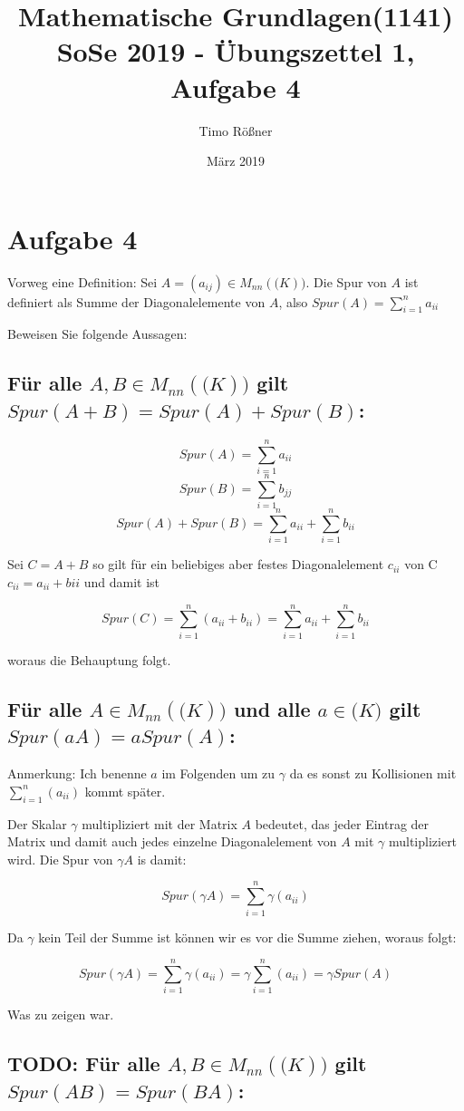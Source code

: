 \documentclass{article}
\title{Mathematische Grundlagen(1141) SoSe 2019 - Übungszettel 1, Aufgabe 4}
\author{Timo Rößner }
\date{März 2019}
\begin{document}
\maketitle

\section*{Aufgabe 4}

Vorweg eine Definition: Sei \(A = (a_{ij}) \in M_{nn}(\mathbb(K)) \). Die Spur von \(A\) ist definiert als Summe der Diagonalelemente von \(A\), also \(Spur(A) = \sum_{i = 1}^{n} a_{ii}\)

Beweisen Sie folgende Aussagen:

\subsection*{Für alle \(A, B \in M_{nn}(\mathbb(K))\) gilt \(Spur(A + B) = Spur(A) + Spur(B) \):}

\[
Spur(A) = \sum_{i = 1}^{n} a_{ii}
\]
\[
Spur(B) = \sum_{i = 1}^{n} b_{jj}
\]
\[
Spur(A) + Spur(B) = \sum_{i = 1}^{n} a_{ii} + \sum_{i = 1}^{n} b_{ii}
\]

Sei \(C = A + B\) so gilt für ein beliebiges aber festes Diagonalelement \(c_{ii}\) von C \(c_{ii} = a_{ii} + b{ii}\) und damit ist

\[
Spur(C) = \sum_{i = 1}^{n} (a_{ii} + b_{ii}) = \sum_{i = 1}^{n} a_{ii} + \sum_{i = 1}^{n} b_{ii}
\]

woraus die Behauptung folgt.

\subsection*{Für alle \(A \in M_{nn}(\mathbb(K))\) und alle \(a \in \mathbb(K)\) gilt \(Spur(aA) = a Spur(A)\):}

Anmerkung: Ich benenne \(a\) im Folgenden um zu \(\gamma\) da es sonst zu Kollisionen mit \(\sum_{i = 1}^{n} (a_{ii})\) kommt später.

Der Skalar \(\gamma\) multipliziert mit der Matrix \(A\) bedeutet, das jeder Eintrag der Matrix und damit auch jedes einzelne Diagonalelement von \(A\) mit \(\gamma\) multipliziert wird. Die Spur von \(\gamma A\) is damit:

\[
Spur(\gamma A) = \sum_{i = 1}^{n} \gamma (a_{ii})
\]

Da \(\gamma\) kein Teil der Summe ist können wir es vor die Summe ziehen, woraus folgt:

\[
Spur(\gamma A) = \sum_{i = 1}^{n} \gamma (a_{ii}) = \gamma \sum_{i = 1}^{n} (a_{ii}) = \gamma Spur(A)\]

Was zu zeigen war.

\subsection*{TODO: Für alle \(A, B \in M_{nn}(\mathbb(K))\) gilt \(Spur(AB) = Spur(BA) \):}
\end{document}
